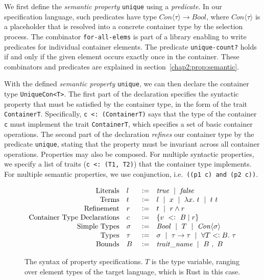 We first define the \emph{semantic property} \lstinline{unique} using a \emph{predicate}.
In our specification language, such predicates have type $\mathit{Con}\langle\tau\rangle \to \mathit{Bool}$, where $\mathit{Con}\langle\tau\rangle$ is a placeholder that is resolved into a concrete container type by 
the selection process. The combinator \lstinline{for-all-elems} is part of a library enabling to write predicates for individual container elements. The predicate \lstinline{unique-count?} holds if and only if the given element occurs exactly once in the container. These combinators and predicates are explained in section~\ref{chap2:prop:semantic}.

With the defined \emph{semantic property} \lstinline{unique}, we can then declare the container type \lstinline{UniqueCon<T>}. 
The first part of the declaration specifies the syntactic property that must be satisfied by the container type, in the form of the trait 
\lstinline{ContainerT}. Specifically, \lstinline{c <: (ContainerT)} says that the type of the container \lstinline{c} must implement the trait \lstinline{ContainerT}, which specifies a set of basic container operations. 
The second part of the declaration \emph{refines} our container type by the predicate \lstinline{unique}, stating that the property must be invariant across all container operations.
Properties may also be composed. For multiple syntactic properties, we specify a list of traits (\lstinline{c <: (T1, T2)}) that the container type implements. For multiple semantic properties, we use conjunction, i.e.\ \lstinline{((p1 c) and (p2 c))}.

\begin{figure}[t]
  \begin{alignat*}{3}
  \mathrm{Literals} \quad 
  &l \ &\mathrel{\mathop:}= \quad &\mathit{true} \ \mid \  \mathit{false}
  \\[-.25em]
  \mathrm{Terms} \quad
  &t \ &\mathrel{\mathop:}= \quad &l \ \mid \  x \ \mid \  \lambda x.\ t \ \mid \  t\ t
  \\[-.25em]
  \mathrm{Refinement} \quad 
  &r \ &\mathrel{\mathop:}= \quad &t \ \mid \  r \wedge r
  \\[-.25em]
  \mathrm{Container\ Type\ Declarations} \quad 
  &c \ &\mathrel{\mathop:}= \quad &\{v \ <\mathrel{\mathop:}\ B \mid r\}
  \\[-.25em]
  \mathrm{Simple\ Types} \quad 
  &\sigma \ &\mathrel{\mathop:}= \quad &\mathit{Bool} \ \mid \  T \ \mid \  \mathit{Con}\langle\sigma\rangle 
  \\[-.25em]
  \mathrm{Types} \quad 
  &\tau \ &\mathrel{\mathop:}= \quad &\sigma \ \mid \  \tau \to \tau \ \mid \  \forall T <\mathrel{\mathop:} B .\ \tau
  \\[-.25em]
  \mathrm{Bounds} \quad
  &B \ &\mathrel{\mathop:}= \quad &\mathit{trait\_name} \ \mid \  B \ , \  B
  \end{alignat*}
  \caption{The syntax of property specifications. $T$ is the type variable, ranging over element types of the target language, which is Rust in this case.}
  \label{prop:syntax}
\end{figure}

